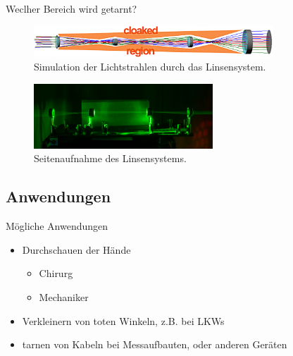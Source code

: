 \begin{frame}{Weclher Bereich wird getarnt?}
  \begin{figure}
    \centering
    \caption{Simulation der Lichtstrahlen durch das Linsensystem.}
    \includegraphics[width=0.8\textwidth]{images/skizze.png}
  \end{figure}
  \begin{figure}
    \centering
    \caption{Seitenaufnahme des Linsensystems.}
    \includegraphics[width=0.6\textwidth]{images/laser-seite.jpg}
  \end{figure}

\end{frame}
\subsection{Anwendungen}
\begin{frame}{M\"ogliche Anwendungen}
  \begin{itemize}
    \item Durchschauen der H\"ande
      \begin{itemize}
        \item Chirurg
        \item Mechaniker
      \end{itemize}
    \item Verkleinern von toten Winkeln, z.B. bei LKWs
    \item tarnen von Kabeln bei Messaufbauten, oder anderen Ger\"aten
  \end{itemize}
\end{frame}
